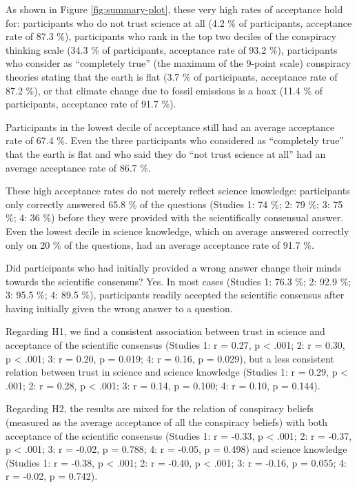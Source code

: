 \documentclass[
  doc,floatsintext]{apa6}
\begin{document}
As shown in Figure \ref{fig:summary-plot}, these very high rates of acceptance hold for: participants who do not trust science at all (4.2 \% of participants, acceptance rate of 87.3 \%), participants who rank in the top two deciles of the conspiracy thinking scale (34.3 \% of participants, acceptance rate of 93.2 \%), participants who consider as ``completely true'' (the maximum of the 9-point scale) conspiracy theories stating that the earth is flat (3.7 \% of participants, acceptance rate of 87.2 \%), or that climate change due to fossil emissions is a hoax (11.4 \% of participants, acceptance rate of 91.7 \%).

Participants in the lowest decile of acceptance still had an average acceptance rate of 67.4 \%. Even the three participants who considered as ``completely true'' that the earth is flat and who said they do ``not trust science at all'' had an average acceptance rate of 86.7 \%.

These high acceptance rates do not merely reflect science knowledge: participants only correctly answered 65.8 \% of the questions (Studies 1: 74 \%; 2: 79 \%; 3: 75 \%; 4: 36 \%) before they were provided with the scientifically consensual answer. Even the lowest decile in science knowledge, which on average answered correctly only on 20 \% of the questions, had an average acceptance rate of 91.7 \%.

Did participants who had initially provided a wrong answer change their minds towards the scientific consensus? Yes. In most cases (Studies 1: 76.3 \%; 2: 92.9 \%; 3: 95.5 \%; 4: 89.5 \%), participants readily accepted the scientific consensus after having initially given the wrong answer to a question.

Regarding H1, we find a consistent association between trust in science and acceptance of the scientific consensus (Studies 1: r = 0.27, p \textless{} .001; 2: r = 0.30, p \textless{} .001; 3: r = 0.20, p = 0.019; 4: r = 0.16, p = 0.029), but a less consistent relation between trust in science and science knowledge (Studies 1: r = 0.29, p \textless{} .001; 2: r = 0.28, p \textless{} .001; 3: r = 0.14, p = 0.100; 4: r = 0.10, p = 0.144).

Regarding H2, the results are mixed for the relation of conspiracy beliefs (measured as the average acceptance of all the conspiracy beliefs) with both acceptance of the scientific consensus (Studies 1: r = -0.33, p \textless{} .001; 2: r = -0.37, p \textless{} .001; 3: r = -0.02, p = 0.788; 4: r = -0.05, p = 0.498) and science knowledge (Studies 1: r = -0.38, p \textless{} .001; 2: r = -0.40, p \textless{} .001; 3: r = -0.16, p = 0.055; 4: r = -0.02, p = 0.742).
\end{document}
